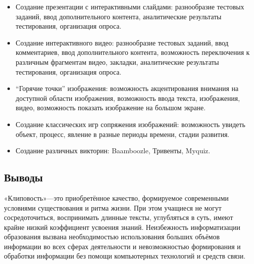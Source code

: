 \documentclass[10pt, a5paper]{article}
\begin{document}
\begin{itemize}
  \item Создание презентации с интерактивными слайдами: разнообразие тестовых заданий, ввод дополнительного контента, аналитические результаты тестирования, организация опроса.
  \item Создание интерактивного видео: разнообразие тестовых заданий, ввод комментариев, ввод дополнительного контента, возможность переключения к различным фрагментам видео, закладки, аналитические результаты тестирования, организация опроса.
  \item ``Горячие точки'' изображения: возможность акцентирования внимания на доступной области изображения, возможность ввода текста, изображения, видео, возможность показать изображение на большом экране.
  \item Создание классических игр сопряжения изображений: возможность увидеть объект, процесс, явление в разные периоды времени, стадии развития.
  \item Создание различных викторин: Baamboozle, Тривенты, \linebreak Myquiz.
\end{itemize}

\subsection*{Выводы}

«Клиповость»—это приобретённое качество, формируемое современными условиями существования и ритма жизни. При этом учащиеся не могут сосредоточиться, воспринимать длинные тексты, углубляться в суть, имеют крайне низкий коэффициент усвоения знаний. Неизбежность информатизации образования вызвана необходимостью использования больших объёмов информации во всех сферах деятельности и невозможностью формирования и обработки информации без помощи компьютерных технологий и средств связи.
\end{document}
